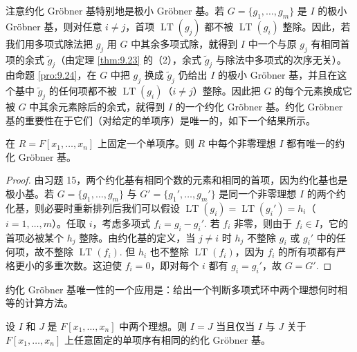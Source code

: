 注意约化 Gröbner 基特别地是极小 Gröbner 基。若 \(G = \{g_1, \ldots, g_m\}\) 是 \(I\) 的极小 Gröbner 基，则对任意 \(i \neq j\)，首项 \(\operatorname{LT}(g_j)\) 都不被 \(\operatorname{LT}(g_i)\) 整除。因此，若我们用多项式除法把 \(g_j\) 用 \(G\) 中其余多项式除，就得到 \(I\) 中一个与原 \(g_j\) 有相同首项的余式 \(\tilde{g}_j\)（由定理 \ref{thm:9.23} 的（2），余式 \(\tilde{g}_j\) 与除法中多项式的次序无关）。由命题 \ref{pro:9.24}，在 \(G\) 中把 \(g_j\) 换成 \(\tilde{g}_j\) 仍给出 \(I\) 的极小 Gröbner 基，并且在这个基中 \(\tilde{g}_j\) 的任何项都不被 \(\operatorname{LT}(g_i)\)（\(i \neq j\)）整除。因此把 \(G\) 的每个元素换成它被 \(G\) 中其余元素除后的余式，就得到 \(I\) 的一个约化 Gröbner 基。约化 Gröbner 基的重要性在于它们（对给定的单项序）是唯一的，如下一个结果所示。

\begin{theorem}\label{thm:9.27}
在 \(R = F[x_1, \ldots, x_n]\) 上固定一个单项序。则 \(R\) 中每个非零理想 \(I\) 都有唯一的约化 Gröbner 基。
\end{theorem}

\begin{proof}
由习题 15，两个约化基有相同个数的元素和相同的首项，因为约化基也是极小基。若 \(G = \{g_1, \ldots, g_m\}\) 与 \(G' = \{g_1', \ldots, g_m'\}\) 是同一个非零理想 \(I\) 的两个约化基，则必要时重新排列后我们可以假设 \(\operatorname{LT}(g_i) = \operatorname{LT}(g_i') = h_i\)（\(i = 1, \ldots, m\)）。任取 \(i\)，考虑多项式 \(f_i = g_i - g_i'\). 若 \(f_i\) 非零，则由于 \(f_i \in I\)，它的首项必被某个 \(h_j\) 整除。由约化基的定义，当 \(j \neq i\) 时 \(h_j\) 不整除 \(g_i\) 或 \(g_i'\) 中的任何项，故不整除 \(\operatorname{LT}(f_i)\). 但 \(h_i\) 也不整除 \(\operatorname{LT}(f_i)\)，因为 \(f_i\) 的所有项都有严格更小的多重次数。这迫使 \(f_i = 0\)，即对每个 \(i\) 都有 \(g_i = g_i'\)，故 \(G = G'\).
\end{proof}

约化 Gröbner 基唯一性的一个应用是：给出一个判断多项式环中两个理想何时相等的计算方法。

\begin{corollary}\label{cor:9.28}
设 \(I\) 和 \(J\) 是 \(F[x_1, \ldots, x_n]\) 中两个理想。则 \(I = J\) 当且仅当 \(I\) 与 \(J\) 关于 \(F[x_1, \ldots, x_n]\) 上任意固定的单项序有相同的约化 Gröbner 基。
\end{corollary}

